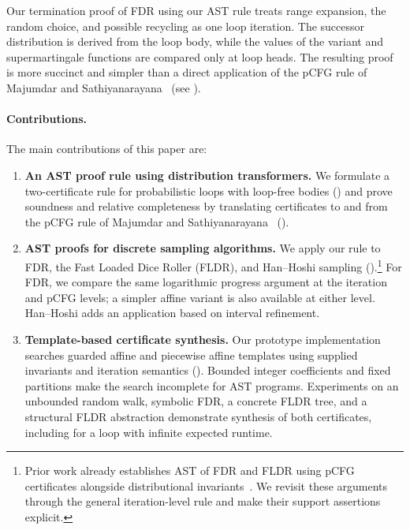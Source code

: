 Our termination proof of FDR using our AST rule treats range expansion,
the random choice, and possible recycling as one loop iteration.
The successor distribution is derived from the loop body, while the
values of the variant and supermartingale functions are compared only
at loop heads. The resulting proof is more succinct and simpler than
a direct application of the pCFG rule of Majumdar and
Sathiyanarayana~\cite{DBLP:journals/pacmpl/MajumdarS25}
(see ).

\paragraph{Contributions.}
The main contributions of this paper are:
\begin{enumerate}
\item \textbf{An AST proof rule using distribution transformers.}
We formulate a two-certificate rule for probabilistic loops with loop-free
bodies () and prove soundness and relative completeness
by translating certificates to and from the pCFG rule of Majumdar and
Sathiyanarayana~\cite{DBLP:journals/pacmpl/MajumdarS25}
().

\item \textbf{AST proofs for discrete sampling algorithms.}
We apply our rule to FDR, the Fast Loaded Dice Roller (FLDR), and
Han--Hoshi sampling
().\footnote{%
Prior work already establishes AST of FDR and FLDR using pCFG
certificates alongside distributional
invariants~\cite{zilken2026verifyingsamplingalgorithmsdistributional}.
We revisit these arguments through the general iteration-level rule
and make their support assertions explicit.}
For FDR, we compare the same logarithmic progress argument at the
iteration and pCFG levels; a simpler affine variant is also available
at either level. Han--Hoshi adds an application based on interval
refinement.

\item \textbf{Template-based certificate synthesis.}
Our prototype implementation searches guarded affine and piecewise
affine templates using supplied invariants and iteration semantics
(). Bounded integer coefficients and
fixed partitions make the search incomplete for AST programs.
Experiments on an unbounded random walk, symbolic FDR, a concrete FLDR
tree, and a structural FLDR abstraction demonstrate synthesis of both
certificates, including for a loop with infinite expected runtime.
\end{enumerate}

